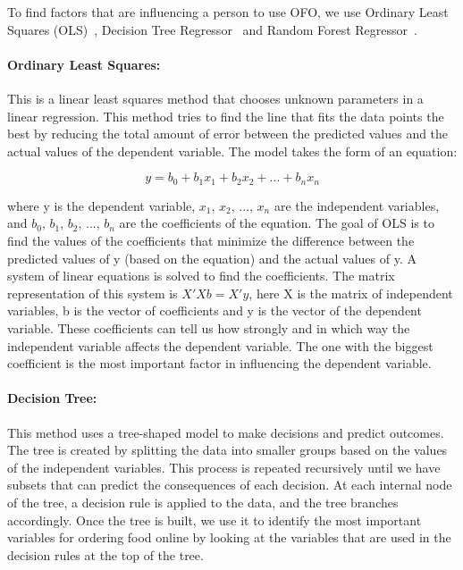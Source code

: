 \documentclass[a4paper,fleqn]{cas-sc}
\begin{document}
To find factors that are influencing a person to use OFO, we use Ordinary Least Squares (OLS)~\cite{ols}, Decision Tree Regressor~\cite{decision_tree} and Random Forest Regressor~\cite{random_forest}. 


\paragraph{Ordinary Least Squares:}
This is a linear least squares method that chooses unknown parameters in a linear regression. This method tries to find the line that fits the data points the best by reducing the total amount of error between the predicted values and the actual values of the dependent variable. The model takes the form of an equation:

\begin{equation}
    y = b_0 + b_1x_1 + b_2x_2 + ... + b_nx_n
\end{equation}

where y is the dependent variable, $x_1$, $x_2$, ..., $x_n$ are the independent variables, and $b_0$, $b_1$, $b_2$, ..., $b_n$ are the coefficients of the equation. The goal of OLS is to find the values of the coefficients that minimize the difference between the predicted values of y (based on the equation) and the actual values of y. A system of linear equations is solved to find the coefficients. The matrix representation of this system is $X'Xb = X'y$, here X is the matrix of independent variables, b is the vector of coefficients and y is the vector of the dependent variable. These coefficients can tell us how strongly and in which way the independent variable affects the dependent variable. The one with the biggest coefficient is the most important factor in influencing the dependent variable. 

\paragraph{Decision Tree:} 
This method uses a tree-shaped model to make decisions and predict outcomes. The tree is created by splitting the data into smaller groups based on the values of the independent variables. This process is repeated recursively until we have subsets that can predict the consequences of each decision. At each internal node of the tree, a decision rule is applied to the data, and the tree branches accordingly. Once the tree is built, we use it to identify the most important variables for ordering food online by looking at the variables that are used in the decision rules at the top of the tree. 
\end{document}
